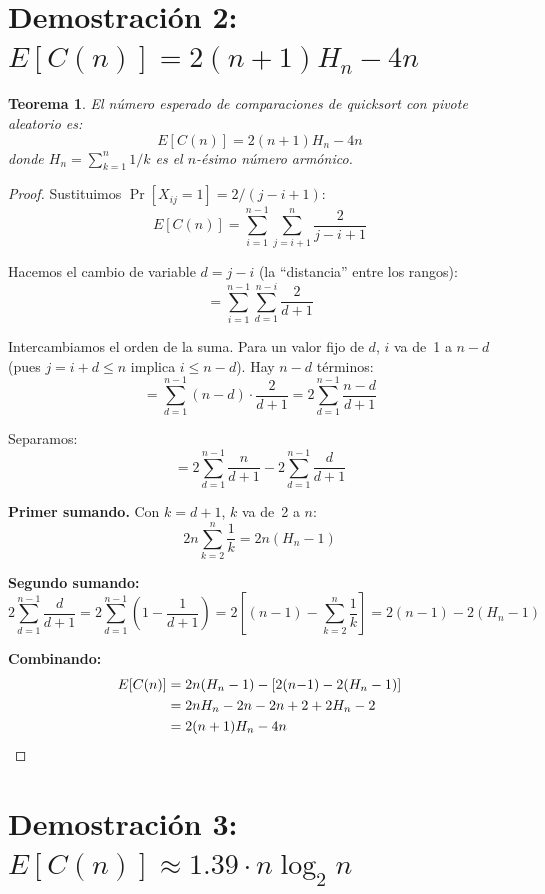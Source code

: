 \documentclass[11pt, letterpaper]{article}
\theoremstyle{definition}
\theoremstyle{plain}
\newtheorem{theorem}{Teorema}[section]
\theoremstyle{remark}
\begin{document}
\section{Demostración 2:
  \texorpdfstring{$E[C(n)] = 2(n+1)H_n - 4n$}{E[C(n)] = 2(n+1)Hn - 4n}}

\begin{theorem}\label{thm:expected}
El número esperado de comparaciones de quicksort con pivote aleatorio
es:
\[
  E[C(n)] = 2(n+1)H_n - 4n
\]
donde $H_n = \sum_{k=1}^{n} 1/k$ es el $n$-ésimo número armónico.
\end{theorem}

\begin{proof}
Sustituimos $\Pr[X_{ij} = 1] = 2/(j-i+1)$:
\[
  E[C(n)] = \sum_{i=1}^{n-1} \sum_{j=i+1}^{n} \frac{2}{j - i + 1}
\]

Hacemos el cambio de variable $d = j - i$ (la ``distancia'' entre los
rangos):
\[
  = \sum_{i=1}^{n-1} \sum_{d=1}^{n-i} \frac{2}{d + 1}
\]

Intercambiamos el orden de la suma. Para un valor fijo de $d$, $i$ va
de~1 a $n - d$ (pues $j = i + d \leq n$ implica $i \leq n - d$). Hay
$n - d$ términos:
\[
  = \sum_{d=1}^{n-1} (n - d) \cdot \frac{2}{d + 1}
  = 2 \sum_{d=1}^{n-1} \frac{n - d}{d + 1}
\]

Separamos:
\[
  = 2 \sum_{d=1}^{n-1} \frac{n}{d+1}
  - 2 \sum_{d=1}^{n-1} \frac{d}{d+1}
\]

\textbf{Primer sumando.} Con $k = d + 1$, $k$ va de~2 a $n$:
\[
  2n \sum_{k=2}^{n} \frac{1}{k} = 2n(H_n - 1)
\]

\textbf{Segundo sumando:}
\[
  2 \sum_{d=1}^{n-1} \frac{d}{d+1}
  = 2 \sum_{d=1}^{n-1} \left(1 - \frac{1}{d+1}\right)
  = 2\left[(n{-}1) - \sum_{k=2}^{n} \frac{1}{k}\right]
  = 2(n{-}1) - 2(H_n - 1)
\]

\textbf{Combinando:}
\begin{align*}
  E[C(n)] &= 2n(H_n - 1) - [2(n{-}1) - 2(H_n - 1)] \\
          &= 2nH_n - 2n - 2n + 2 + 2H_n - 2 \\
          &= 2(n+1)H_n - 4n \qedhere
\end{align*}
\end{proof}

\section{Demostración 3:
  \texorpdfstring{$E[C(n)] \approx 1.39 \cdot n \log_2 n$}%
  {E[C(n)] approx 1.39 n log2 n}}
\end{document}

